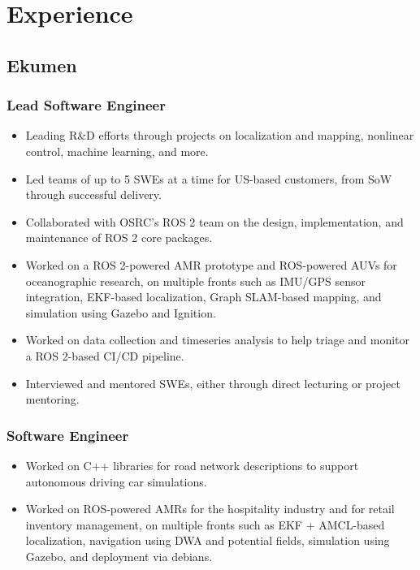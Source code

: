 \documentclass[english, letterpaper]{resume}
\renewcommand{\date}[2]{%
  \DTMenglishshortmonthname{#2} #1}
\begin{document}
\section*{Experience}

\subsection*[\icon{ekumen}]{Ekumen }

\subsubsection*{Lead Software Engineer \thru{\date{2018}{9}}{Present}}
\begin{itemize}
  \item Leading R\&D efforts through projects on localization and mapping, nonlinear control, machine learning, and more.
  \item Led teams of up to 5 SWEs at a time for US-based customers, from SoW through successful delivery.
  \item Collaborated with OSRC's ROS 2 team on the design, implementation, and maintenance of ROS 2 core packages.
  \item Worked on a ROS 2-powered AMR prototype and ROS-powered AUVs for oceanographic research, on multiple fronts such as IMU/GPS sensor integration, EKF-based localization, Graph SLAM-based mapping, and simulation using Gazebo and Ignition.
  \item Worked on data collection and timeseries analysis to help triage and monitor a ROS 2-based CI/CD pipeline.
  \item Interviewed and mentored SWEs, either through direct lecturing or project mentoring.
\end{itemize}

\subsubsection*{Software Engineer \thru{\date{2015}{8}}{\date{2018}{9}}}
\begin{itemize}
  \item Worked on C++ libraries for road network descriptions to support autonomous driving car simulations.
  \item Worked on ROS-powered AMRs for the hospitality industry and for retail inventory management, on multiple fronts such as EKF + AMCL-based localization, navigation using DWA and potential fields, simulation using Gazebo, and deployment via debians.
\end{itemize}
\end{document}
